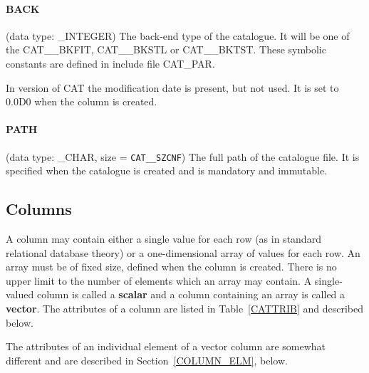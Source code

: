 \paragraph{BACK}
(data type: \_INTEGER)
The back-end type of the catalogue. It will be one of the CAT\_\_BKFIT,
CAT\_\_BKSTL or CAT\_\_BKTST. These symbolic constants are defined in
include file CAT\_PAR.

In version \CATversion of CAT the modification date is present, but
not used. It is set to 0.0D0 when the column is created.

\paragraph{PATH}
(data type: \_CHAR, size = {\tt CAT\_\_SZCNF}) The full path of the
catalogue file. It is specified when the catalogue is created and is
mandatory and immutable.

\subsection{\label{COLS}Columns}

A column may contain either a single value for each row (as in
standard relational database theory) or a one-dimensional array of
values for each row. An array must be of fixed size, defined when the
column is created. There is no upper limit to the number of elements
which an array may contain. A single-valued column is called a {\bf
scalar} and a column containing an array is called  a {\bf vector}.
The attributes of a column are listed in Table~\ref{CATTRIB} and
described below.

The attributes of an individual element of a vector column are somewhat
different and are described in Section~\ref{COLUMN_ELM}, below.

